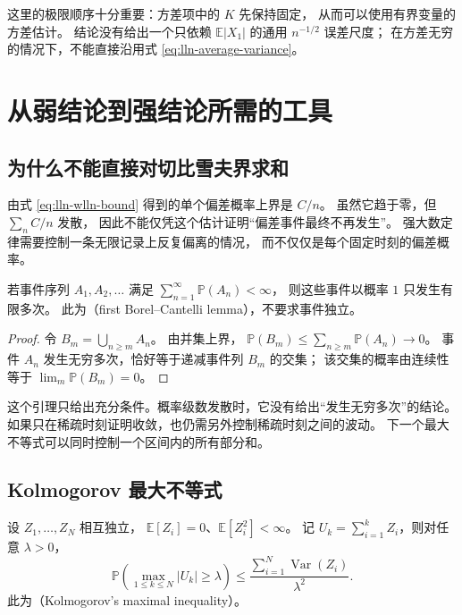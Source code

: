 \documentclass[UTF8]{ctexart}
\begin{document}
这里的极限顺序十分重要：方差项中的 $K$ 先保持固定，
从而可以使用有界变量的方差估计。
结论没有给出一个只依赖 $\mathbb E|X_1|$ 的通用 $n^{-1/2}$ 误差尺度；
在方差无穷的情况下，不能直接沿用式 \eqref{eq:lln-average-variance}。

\section{从弱结论到强结论所需的工具}
\label{sec:lln-strong-tools}

\subsection{为什么不能直接对切比雪夫界求和}

由式 \eqref{eq:lln-wlln-bound} 得到的单个偏差概率上界是 $C/n$。
虽然它趋于零，但 $\sum_n C/n$ 发散，
因此不能仅凭这个估计证明“偏差事件最终不再发生”。
强大数定律需要控制一条无限记录上反复偏离的情况，
而不仅仅是每个固定时刻的偏差概率。

\begin{lemma}
\label{lem:lln-borel-cantelli}
若事件序列 $A_1,A_2,\ldots$ 满足
$\sum_{n=1}^\infty\mathbb P(A_n)<\infty$，
则这些事件以概率 $1$ 只发生有限多次。
此为（first Borel--Cantelli lemma），不要求事件独立。
\end{lemma}

\begin{proof}
令 $B_m=\bigcup_{n\geq m}A_n$。
由并集上界，
$\mathbb P(B_m)\leq\sum_{n\geq m}\mathbb P(A_n)\to0$。
事件 $A_n$ 发生无穷多次，恰好等于递减事件列 $B_m$ 的交集；
该交集的概率由连续性等于 $\lim_m\mathbb P(B_m)=0$。
\end{proof}

这个引理只给出充分条件。概率级数发散时，它没有给出“发生无穷多次”的结论。
如果只在稀疏时刻证明收敛，也仍需另外控制稀疏时刻之间的波动。
下一个最大不等式可以同时控制一个区间内的所有部分和。

\subsection{Kolmogorov 最大不等式}

\begin{lemma}[独立中心化部分和的最大不等式]
\label{lem:lln-kolmogorov-maximal}
设 $Z_1,\ldots,Z_N$ 相互独立，
$\mathbb E[Z_i]=0$、$\mathbb E[Z_i^2]<\infty$。
记 $U_k=\sum_{i=1}^k Z_i$，则对任意 $\lambda>0$，
\begin{equation}
  \mathbb P\left(\max_{1\leq k\leq N}|U_k|\geq\lambda\right)
  \leq\frac{\sum_{i=1}^N\operatorname{Var}(Z_i)}{\lambda^2}.
  \label{eq:lln-maximal}
\end{equation}
此为（Kolmogorov's maximal inequality）。
\end{lemma}
\end{document}
